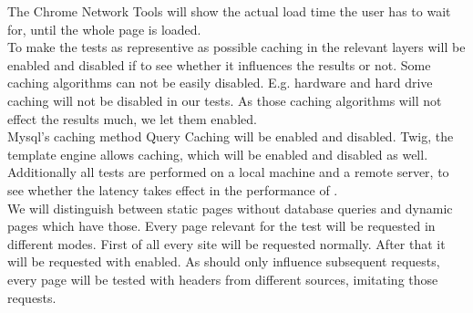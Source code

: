 The Chrome Network Tools will show the actual load time the user has to wait for, until the whole page is loaded.
\\
To make the tests as representive as possible caching in the relevant layers will be enabled and disabled if to see whether it influences the results or not.
Some caching algorithms can not be easily disabled.
E.g. hardware and hard drive caching will not be disabled in our tests.
As those caching algorithms will not effect the results much, we let them enabled.
\\
Mysql's caching method Query Caching will be enabled and disabled.
Twig, the template engine allows caching, which will be enabled and disabled as well.
Additionally all tests are performed on a local machine and a remote server, to see whether the latency takes effect in the performance of \lare{}.
\\
We will distinguish between static pages without database queries and dynamic pages which have those.
Every page relevant for the test will be requested in different modes.
First of all every site will be requested normally.
After that it will be requested with \lare{} enabled.
As \lare{} should only influence subsequent requests, every page will be tested with \http{} headers from different sources, imitating those requests.

%
%
%


